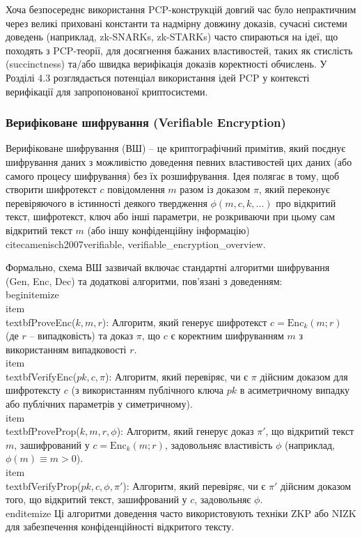 \documentclass[a4paper,12pt]{article}
\begin{document}
    Хоча безпосереднє використання PCP-конструкцій довгий час було непрактичним через великі приховані константи та надмірну довжину доказів, сучасні системи доведень (наприклад, zk-SNARKs, zk-STARKs) часто спираються на ідеї, що походять з PCP-теорії, для досягнення бажаних властивостей, таких як стислість (succinctness) та/або швидка верифікація доказів коректності обчислень. У Розділі 4.3 розглядається потенціал використання ідей PCP у контексті верифікації для запропонованої криптосистеми.
    
    \subsubsection{Верифіковане шифрування (Verifiable Encryption)} %
    
    Верифіковане шифрування (ВШ) -- це криптографічний примітив, який поєднує шифрування даних з можливістю доведення певних властивостей цих даних (або самого процесу шифрування) без їх розшифрування. Ідея полягає в тому, щоб створити шифротекст \(c\) повідомлення \(m\) разом із доказом \(\pi\), який переконує перевіряючого в істинності деякого твердження \(\phi(m, c, k, ...)\) про відкритий текст, шифротекст, ключ або інші параметри, не розкриваючи при цьому сам відкритий текст \(m\) (або іншу конфіденційну інформацію) \\cite{camenisch2007verifiable, verifiable_encryption_overview}.

    Формально, схема ВШ зазвичай включає стандартні алгоритми шифрування (Gen, Enc, Dec) та додаткові алгоритми, пов'язані з доведенням:
    \\begin{itemize}
        \\item \\textbf{ProveEnc(\(k, m, r\)):} Алгоритм, який генерує шифротекст \(c = \text{Enc}_k(m; r)\) (де \(r\) -- випадковість) та доказ \(\pi\), що \(c\) є коректним шифруванням \(m\) з використанням випадковості \(r\).
        \\item \\textbf{VerifyEnc(\(pk, c, \pi\)):} Алгоритм, який перевіряє, чи є \(\pi\) дійсним доказом для шифротексту \(c\) (з використанням публічного ключа \(pk\) в асиметричному випадку або публічних параметрів у симетричному).
        \\item \\textbf{ProveProp(\(k, m, r, \phi\)):} Алгоритм, який генерує доказ \(\pi'\), що відкритий текст \(m\), зашифрований у \(c = \text{Enc}_k(m; r)\), задовольняє властивість \(\phi\) (наприклад, \(\phi(m) \equiv m>0\)).
        \\item \\textbf{VerifyProp(\(pk, c, \phi, \pi'\)):} Алгоритм, який перевіряє, чи є \(\pi'\) дійсним доказом того, що відкритий текст, зашифрований у \(c\), задовольняє \(\phi\).
    \\end{itemize}
    Ці алгоритми доведення часто використовують техніки ZKP або NIZK для забезпечення конфіденційності відкритого тексту.
\end{document}
